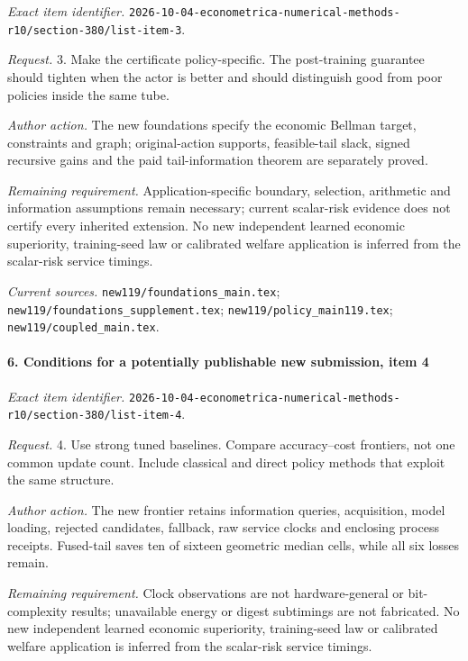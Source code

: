 \emph{Exact item identifier.} \nolinkurl{2026-10-04-econometrica-numerical-methods-r10/section-380/list-item-3}.

\par\emph{Request.} 3. Make the certificate policy-specific. The post-training guarantee should tighten when the actor is better and should distinguish good from poor policies inside the same tube.

\par\emph{Author action.} The new foundations specify the economic Bellman target, constraints and graph; original-action supports, feasible-tail slack, signed recursive gains and the paid tail-information theorem are separately proved.

\par\emph{Remaining requirement.} Application-specific boundary, selection, arithmetic and information assumptions remain necessary; current scalar-risk evidence does not certify every inherited extension. No new independent learned economic superiority, training-seed law or calibrated welfare application is inferred from the scalar-risk service timings.

\par\emph{Current sources.} \nolinkurl{new119/foundations_main.tex}; \nolinkurl{new119/foundations_supplement.tex}; \nolinkurl{new119/policy_main119.tex}; \nolinkurl{new119/coupled_main.tex}.

\paragraph{6. Conditions for a potentially publishable new submission, item 4}

\emph{Exact item identifier.} \nolinkurl{2026-10-04-econometrica-numerical-methods-r10/section-380/list-item-4}.

\par\emph{Request.} 4. Use strong tuned baselines. Compare accuracy--cost frontiers, not one common update count. Include classical and direct policy methods that exploit the same structure.

\par\emph{Author action.} The new frontier retains information queries, acquisition, model loading, rejected candidates, fallback, raw service clocks and enclosing process receipts. Fused-tail saves ten of sixteen geometric median cells, while all six losses remain.

\par\emph{Remaining requirement.} Clock observations are not hardware-general or bit-complexity results; unavailable energy or digest subtimings are not fabricated. No new independent learned economic superiority, training-seed law or calibrated welfare application is inferred from the scalar-risk service timings.

